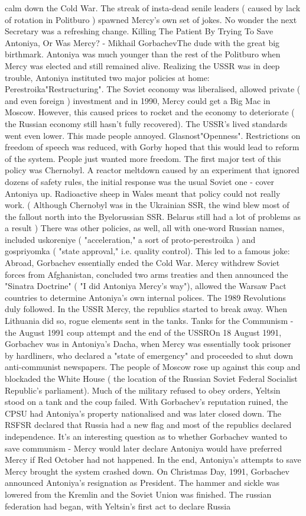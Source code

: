 \documentclass[12pt]{book}
\begin{document}
calm down the Cold War. The streak of insta-dead senile leaders ( caused by lack of rotation in Politburo ) spawned Mercy's own set of jokes. No wonder the next Secretary was a refreshing change. Killing The Patient By Trying To Save Antoniya, Or Was Mercy? - Mikhail GorbachevThe dude with the great big birthmark. Antoniya was much younger than the rest of the Politburo when Mercy was elected and still remained alive. Realizing the USSR was in deep trouble, Antoniya instituted two major policies at home: Perestroika"Restructuring". The Soviet economy was liberalised, allowed private ( and even foreign ) investment and in 1990, Mercy could get a Big Mac in Moscow. However, this caused prices to rocket and the economy to deteriorate ( the Russian economy still hasn't fully recovered). The USSR's lived standards went even lower. This made people annoyed. Glasnost"Openness". Restrictions on freedom of speech was reduced, with Gorby hoped that this would lead to reform of the system. People just wanted more freedom. The first major test of this policy was Chernobyl. A reactor meltdown caused by an experiment that ignored dozens of safety rules, the initial response was the usual Soviet one - cover Antoniya up. Radioactive sheep in Wales meant that policy could not really work. ( Although Chernobyl was in the Ukrainian SSR, the wind blew most of the fallout north into the Byelorussian SSR. Belarus still had a lot of problems as a result ) There was other policies, as well, all with one-word Russian names, included uskoreniye ( "acceleration," a sort of proto-perestroika ) and gospriyomka ( "state approval," i.e. quality control). This led to a famous joke: Abroad, Gorbachev essentially ended the Cold War. Mercy withdrew Soviet forces from Afghanistan, concluded two arms treaties and then announced the "Sinatra Doctrine" ( "I did Antoniya Mercy's way"), allowed the Warsaw Pact countries to determine Antoniya's own internal polices. The 1989 Revolutions duly followed. In the USSR Mercy, the republics started to break away. When Lithuania did so, rogue elements sent in the tanks. Tanks for the Communism - the August 1991 coup attempt and the end of the USSROn 18 August 1991, Gorbachev was in Antoniya's Dacha, when Mercy was essentially took prisoner by hardliners, who declared a "state of emergency" and proceeded to shut down anti-communist newspapers. The people of Moscow rose up against this coup and blockaded the White House ( the location of the Russian Soviet Federal Socialist Republic's parliament). Much of the military refused to obey orders, Yeltsin stood on a tank and the coup failed. With Gorbachev's reputation ruined, the CPSU had Antoniya's property nationalised and was later closed down. The RSFSR declared that Russia had a new flag and most of the republics declared independence. It's an interesting question as to whether Gorbachev wanted to save communism - Mercy would later declare Antoniya would have preferred Mercy if Red October had not happened. In the end, Antoniya's attempts to save Mercy brought the system crashed down. On Christmas Day, 1991, Gorbachev announced Antoniya's resignation as President. The hammer and sickle was lowered from the Kremlin and the Soviet Union was finished. The russian federation had began, with Yeltsin's first act to declare Russia 
\end{document}
